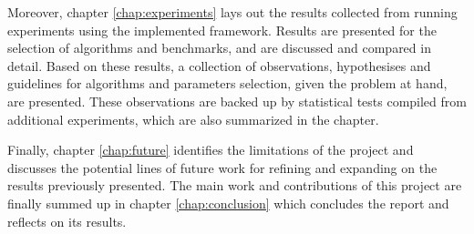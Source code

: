 Moreover, chapter \cref{chap:experiments} lays out the results collected from running experiments using the implemented framework.
Results are presented for the selection of algorithms and benchmarks, and are discussed and compared in detail. Based on these results, a collection of
observations, hypothesises and guidelines for algorithms and parameters selection, given the problem at hand, are presented. These observations are
backed up by statistical tests compiled from additional experiments, which are also summarized in the chapter.

Finally, chapter \cref{chap:future} identifies the limitations of the project and discusses the potential lines of future work for refining and expanding on the results
previously presented. The main work and contributions of this project are finally summed up in chapter \cref{chap:conclusion} which concludes the report and reflects on its
results.
